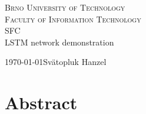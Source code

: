 \documentclass[11pt,a4paper]{article}
\begin{document}
\begin{titlepage}
	\begin{center}
	    {\LARGE\textsc{Brno University of Technology}}\\
	    \smallskip
	    {\Large\textsc{Faculty of Information Technology}}\\
	    \bigskip
	    \smallskip
		\Huge{SFC}\\
		\huge{LSTM network demonstration}
	\end{center}
    {\today \hfill Svätopluk Hanzel}
\end{titlepage}

\tableofcontents

\newpage
\section*{Abstract}
\newpage
\end{document}
